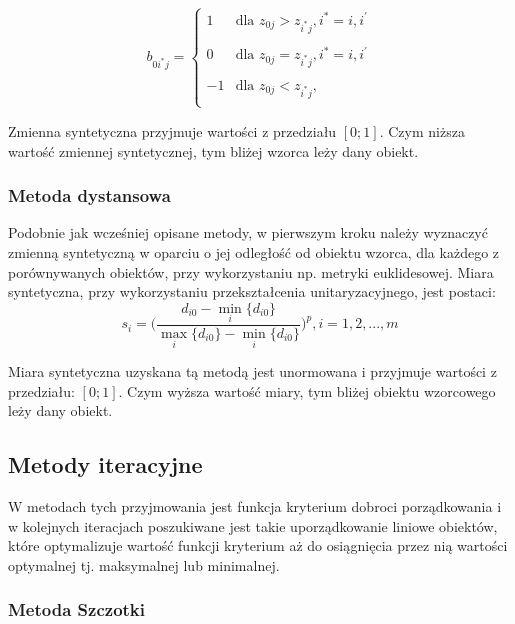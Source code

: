 \documentclass[12pt,a4paper]{report}
\begin{document}
\begin{equation}
b_{0i^{*}j}=\left\{ \begin{array}{lll}
1  & \textrm{dla  } z_{0j}>z_{i^{*}j}, i^{*}=i,i^{'}\\\\
0 & \textrm{dla } z_{0j}=z_{i^{*}j}, i^{*}=i,i^{'}\\\\
-1 & \textrm{dla } z_{0j}<z_{i^{*}j},\\
\end{array} \right.
\end{equation}

Zmienna syntetyczna przyjmuje wartości z przedziału $[0;1]$. Czym niższa wartość zmiennej syntetycznej, tym bliżej wzorca leży dany obiekt.

\subsubsection{Metoda dystansowa}
\noindent

Podobnie jak wcześniej opisane metody, w pierwszym kroku należy wyznaczyć zmienną syntetyczną w oparciu o jej odległość od obiektu wzorca, dla każdego z porównywanych obiektów, przy wykorzystaniu np. metryki euklidesowej. Miara syntetyczna, przy wykorzystaniu przekształcenia unitaryzacyjnego, jest postaci: 
\newline
\begin{equation}
s_{i}=\bigg(\frac{d_{i0}-\min\limits_{i}\{d_{i0}\}}{\max\limits_{i}\{d_{i0}\}-\min\limits_{i}\{d_{i0}\}} \bigg)^{p}, i=1,2,...,m
\end{equation}

Miara syntetyczna uzyskana tą metodą jest unormowana i przyjmuje wartości z przedziału: $[0;1]$. Czym wyższa wartość miary, tym bliżej obiektu wzorcowego leży dany obiekt. 

\subsection{Metody iteracyjne}
\noindent

W metodach tych przyjmowania jest funkcja kryterium dobroci porządkowania i w kolejnych iteracjach poszukiwane jest takie uporządkowanie liniowe obiektów, które optymalizuje wartość funkcji kryterium aż do osiągnięcia przez nią wartości optymalnej tj. maksymalnej lub minimalnej. 


\subsubsection{Metoda Szczotki}
\noindent
\end{document}

